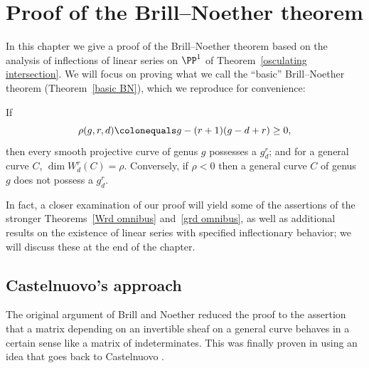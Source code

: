 
\chapter{Proof of the Brill--Noether theorem}
\label{Brill Noether proof chapter}
\label{BrillNoetherproofChapter}

In this chapter we give a proof of the Brill--Noether
theorem based on the analysis
of inflections of linear series on $\PP^{1}$ of
Theorem~\ref{osculating intersection}. We will focus on proving what
we call the ``basic'' Brill--Noether theorem (Theorem~\ref{basic BN}),
which we reproduce for convenience:

\begin{theorem}\label{BN-basic}
If
 $$
 \rho(g,r,d) \colonequals  g - (r+1)(g-d+r) \geq 0,
$$
then every smooth projective curve of genus $g$  possesses a
%
$g^r_d$;
and for a general curve $C$,  $\dim W^r_d(C) = \rho$. Conversely, if
$\rho < 0$ then a general curve $C$ of genus $g$ does not possess a $g^r_d$.
\unif
\end{theorem}

In fact, a closer examination of our proof will yield some of the
assertions of the stronger Theorems~\ref{Wrd omnibus}
and~\ref{grd omnibus}, as well as additional results on the existence of
linear series with specified inflectionary behavior; we will discuss these at
the end of the chapter.

\section{Castelnuovo's approach}

The original argument of Brill and Noether reduced the proof to the
assertion that a matrix depending
on an invertible sheaf on a general curve
%
behaves in a certain sense like a matrix of indeterminates. This was
finally proven in \cite{Griffiths-Harris-BN} using an idea that goes
%
back to Castelnuovo \citeyear{zbMATH02692307}.

